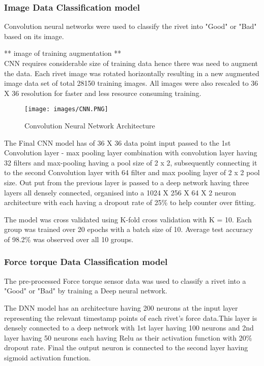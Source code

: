 \documentclass{article}
\begin{document}
\subsubsection{Image Data Classification model}
Convolution neural networks \cite{Krizhevsky:2017:ICD:3098997.3065386} were used to classify the rivet into "Good" or "Bad" based on its image.

** image of training augmentation **\\

CNN requires considerable size of training data hence there was need to augment the data. Each rivet image was rotated horizontally resulting in a new augmented image data set of total 28150 training images. All images were also rescaled to 36 X 36 resolution for faster and less resource consuming training.

\begin{figure}[H]
    \centering
    \texttt{[image: images/CNN.PNG]}
    \caption{Convolution Neural Network Architecture}
    \label{fig:ConvolutionNeuralNetworkArchitecture}
\end{figure}

The Final CNN model has of 36 X 36 data point input passed to the 1st Convolution layer - max pooling layer combination with convolution layer having 32 filters and max-pooling having a pool size of 2 x 2, subsequently connecting it to the second Convolution layer with 64 filter and max pooling layer of 2 x 2 pool size. Out put from the previous layer is passed to a deep network having three layers all densely connected, organised into a 1024 X 256 X 64 X 2 neuron  architecture with each having a dropout rate of 25\% to help counter over fitting.

The model was cross validated using K-fold cross validation with K = 10. Each group was trained over 20 epochs with a batch size of 10. Average test accuracy of 98.2\% was observed over all 10 groups.

\subsubsection{Force torque Data Classification model}

The pre-processed Force torque sensor data was used to classify a rivet into a "Good" or "Bad" by training a Deep neural network.

The DNN model has an architecture having 200 neurons at the input layer representing the relevant timestamp points of each rivet's force data.This layer is densely connected to a deep network with 1st layer having 100 neurons and 2nd layer having 50 neurons each having Relu as their activation function with 20\% dropout rate. Final the output neuron is connected to the second layer having sigmoid activation function.
\end{document}
